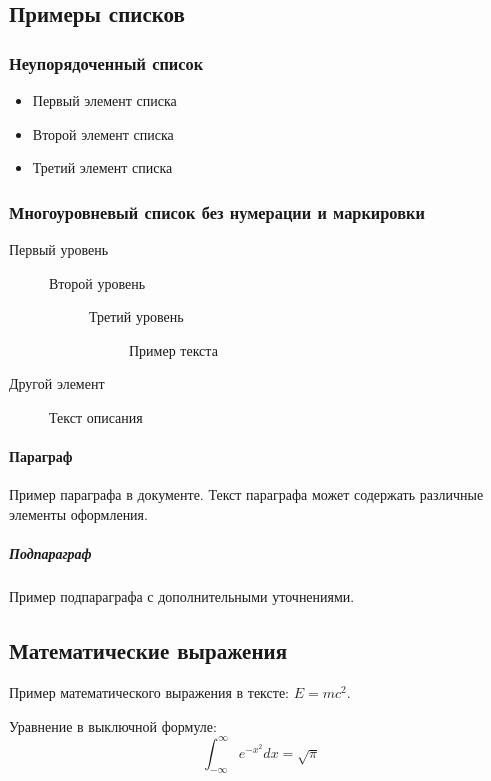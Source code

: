 \subsection{Примеры списков}
\label{subsec:lists}

\subsubsection{Неупорядоченный список}
\begin{itemize}
    \item Первый элемент списка
    \item Второй элемент списка
    \item Третий элемент списка
\end{itemize}

\subsubsection{Многоуровневый список без нумерации и маркировки}
\begin{description}
    \item[Первый уровень] 
        \begin{description}
            \item[Второй уровень] 
                \begin{description}
                    \item[Третий уровень] Пример текста
                \end{description}
        \end{description}
    \item[Другой элемент] Текст описания
\end{description}

\paragraph{Параграф} Пример параграфа в документе. Текст параграфа может содержать различные элементы оформления.

\subparagraph{Подпараграф} Пример подпараграфа с дополнительными уточнениями.

\subsection{Математические выражения}
\label{subsec:math}

Пример математического выражения в тексте: $E = mc^2$.

Уравнение в выключной формуле:
\begin{equation}
    \label{eq:1}
    \int_{-\infty}^\infty e^{-x^2} dx = \sqrt{\pi}
\end{equation}

